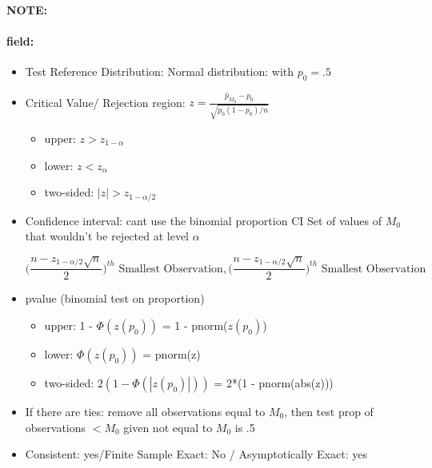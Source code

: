 \documentclass[12pt]{article}
\newenvironment{note}{\paragraph{NOTE:}}{}
\newenvironment{field}{\paragraph{field:}}{}
\begin{document}
\begin{note}
\begin{field}
\begin{itemize}
   \item Test Reference Distribution: Normal distribution: with $p_0 = .5$
   \item Critical Value/ Rejection region: $z = \frac{\hat{p}_{M_0} - p_0}{\sqrt{p_0(1-p_0)/n}}$
         \begin{itemize}
          \item upper: $z > z_{1-\alpha}$
          \item lower: $z < z_\alpha$
          \item two-sided: $|z| > z_{1-\alpha/2}$
         \end{itemize}
   \item Confidence interval: cant use the binomial proportion CI
         Set of values of $M_0$ that wouldn't be rejected at level $\alpha$

         $$ \bigg( \frac{n - z_{1 - \alpha/2} \sqrt{n}}{2}\bigg)^{th} \text{ Smallest Observation}, \bigg( \frac{n - z_{1 - \alpha/2} \sqrt{n}}{2}\bigg)^{th}\text{ Smallest Observation} $$
   \item pvalue (binomial test on proportion)
         \begin{itemize}
          \item upper: 1 - $\Phi(z(p_0))$ = 1 - pnorm($z(p_0)$)
          \item lower: $\Phi(z(p_0))$ = pnorm(z)
          \item two-sided: $2(1 - \Phi(|z(p_0)|))$ = 2*(1 - pnorm(abs(z)))
         \end{itemize}
   \item If there are ties: remove all observations equal to $M_0$, then test prop of observations $< M_0$ given not equal to $M_0$ is .5
   \item Consistent: yes/Finite Sample Exact: No / Asymptotically Exact: yes
  \end{itemize}
 \end{field}
\end{note}
\end{document}
